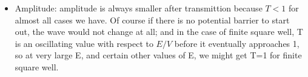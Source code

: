 \documentclass{school-22.101-notes}
\begin{document}
\begin{itemize}
\begin{itemize}
    \item Amplitude: amplitude is always smaller after transmittion because $T<1$ for almost all cases we have. Of course if there is no potential barrier to start out, the wave would not change at all; and in the case of finite square well, T is an oscillating value with respect to $E/V$ before it eventually approaches 1, so at very large E, and certain other values of E, we might get T=1 for finite square well.  
    
    \end{itemize}


\end{itemize}
\end{document}
